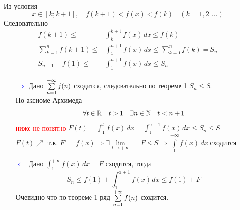 \begin{Proof}~\\
    \begin{figure}[bh]
       \noindent{}
    \end{figure}
    Из условия
    \[
        x \in [k; k+1], \quad f(k+1) < f(x) < f(k) \quad (k=1,2,\dots)
    \]
    Следовательно
    \begin{align*}
        f(k+1) \leqslant &\int_{k}^{k+1}f(x)\,dx \leqslant f(k)\\
        \sum_{k=1}^{n}f(k+1) \leqslant &\int_{1}^{n+1}f(x)\,dx \leqslant \sum_{k=1}^{n}f(k) = S_n\\ 
        S_{n+1} - f(1) \leqslant &\int_{1}^{n+1}f(x)\,dx \leqslant S_n
    \end{align*}
    \begin{enumerate}
        \item[\textcolor{blue}{$\Rightarrow$}] Дано $\sum\limits_{n = 1}^{+\infty}{f(n)}$ сходится, следовательно по  теореме 1 $S_n \leqslant S$.\\
        По аксиоме Архимеда
        \[
            \forall t \in \mathbb{R} \quad t > 1 \quad \exists n \in \mathbb{N} \quad t<n+1
        \]
        \textcolor{red}{ниже не понятно}
        $F(t) = \int_{1}^{t}f(x)\,dx = \int_{1}^{n+1}f(x)\,dx \leqslant S_n \leqslant S$\\
        $F(t) \nearrow$ т.к. $F'=f(x) \Rightarrow \exists \lim\limits_{t \to +\infty} = F \leq S \Rightarrow \int\limits_{1}^{+\infty}f(x)\,dx$ сходится\\
        
        \item[\textcolor{blue}{$\Leftarrow$}] Дано	$\int_{1}^{+\infty}f(x)\,dx = F$ сходится, тогда
        \[
            S_n \leqslant f(1) + \int_{1}^{n+1}f(x)\,dx \leqslant f(1) + F
        \] 
        Очевидно что по теореме 1 ряд $\sum\limits_{n = 1}^{+\infty}{f(n)}$ сходится.
    \end{enumerate}
\end{Proof}